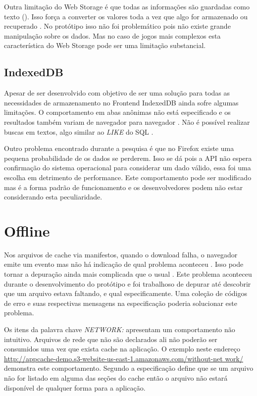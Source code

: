 Outra limitação do Web Storage é que todas as informações são
guardadas como texto (). Isso
força a converter os valores toda a vez que algo for armazenado ou
recuperado \autocite{gameAssetManagement}. No protótipo isso não foi
problemático pois não existe grande manipulação sobre os dados. Mas
no caso de jogos mais complexos esta característica do Web Storage pode
ser uma limitação substancial.

\subsection{IndexedDB}

Apesar de ser desenvolvido com objetivo de ser uma solução para
todas as necessidades de armazenamento no Frontend IndexedDB ainda
sofre algumas limitações. O comportamento em abas anônimas não
está especificado e os resultados também variam de navegador para
navegador . Não é possível
realizar buscas em textos, algo similar ao \textit{LIKE} do SQL
.

Outro problema encontrado durante a pesquisa é que no Firefox existe
uma pequena probabilidade de os dados se perderem. Isso se dá pois a
API não espera confirmação do sistema operacional para considerar
um dado válido, essa foi uma escolha em detrimento de performance.
Este comportamento pode ser modificado mas é a forma padrão de
funcionamento e os desenvolvedores podem não estar considerando esta
peculiaridade.

\section{Offline}

Nos arquivos de cache via manifestos, quando o download falha, o
navegador emite um evento mas não há indicação de qual problema
aconteceu . Isso pode tornar a
depuração ainda mais complicada que o usual \autocite{diveIntohtml}.
Este problema aconteceu durante o desenvolvimento do protótipo e foi
trabalhoso de depurar até descobrir que um arquivo estava faltando,
e qual especificamente. Uma coleção de códigos de erro e suas
respectivas mensagens na especificação poderia solucionar este
problema.

Os itens da palavra chave \textit{NETWORK:} apresentam um
comportamento não intuitivo. Arquivos de rede que não
são declarados ali não poderão ser consumidos uma vez
que exista cache na aplicação. O exemplo neste endereço
\url{http://appcache-demo.s3-website-us-east-1.amazonaws.com/without-net
work/} demonstra este comportamento. Segundo \citet{gameAssetManagement}
a especificação define que se um arquivo não for listado em alguma
das seções do cache então o arquivo não estará disponível de
qualquer forma para a aplicação.

